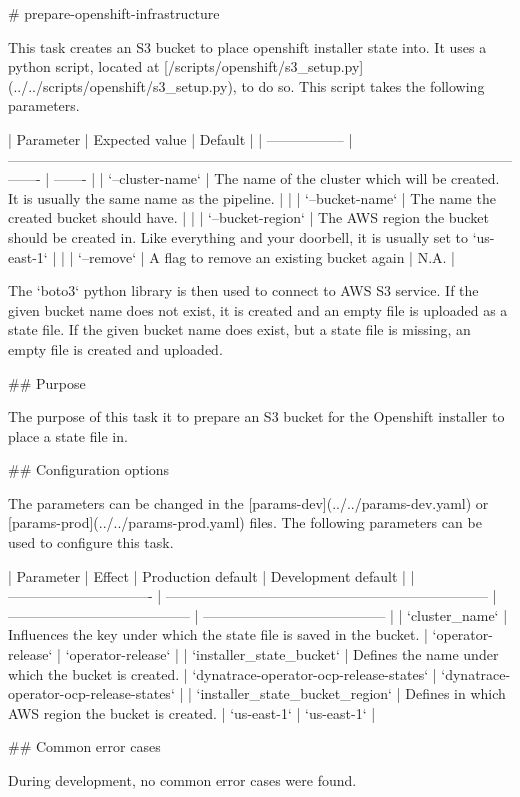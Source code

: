 # prepare-openshift-infrastructure

This task creates an S3 bucket to place openshift installer state into.
It uses a python script, located at [/scripts/openshift/s3_setup.py](../../scripts/openshift/s3_setup.py), to do so.
This script takes the following parameters.

| Parameter         | Expected value                                                                                                      | Default |
| ----------------- | ------------------------------------------------------------------------------------------------------------------- | ------- |
| `--cluster-name`  | The name of the cluster which will be created. It is usually the same name as the pipeline.                         |         |
| `--bucket-name`   | The name the created bucket should have.                                                                            |         |
| `--bucket-region` | The AWS region the bucket should be created in. Like everything and your doorbell, it is usually set to `us-east-1` |         |
| `--remove`        | A flag to remove an existing bucket again                                                                           | N.A.    |

The `boto3` python library is then used to connect to AWS S3 service.
If the given bucket name does not exist, it is created and an empty file is uploaded as a state file.
If the given bucket name does exist, but a state file is missing, an empty file is created and uploaded.

## Purpose

The purpose of this task it to prepare an S3 bucket for the Openshift installer to place a state file in.

## Configuration options

The parameters can be changed in the [params-dev](../../params-dev.yaml) or [params-prod](../../params-prod.yaml) files.
The following parameters can be used to configure this task.

| Parameter                       | Effect                                                                | Production default                      | Development default                     |
| ------------------------------- | --------------------------------------------------------------------- | --------------------------------------- | --------------------------------------- |
| `cluster_name`                  | Influences the key under which the state file is saved in the bucket. | `operator-release`                      | `operator-release`                      |
| `installer_state_bucket`        | Defines the name under which the bucket is created.                   | `dynatrace-operator-ocp-release-states` | `dynatrace-operator-ocp-release-states` |
| `installer_state_bucket_region` | Defines in which AWS region the bucket is created.                    | `us-east-1`                             | `us-east-1`                             |

## Common error cases

During development, no common error cases were found.
